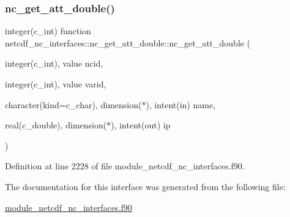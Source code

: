 \subsubsection{\texorpdfstring{nc\+\_\+get\+\_\+att\+\_\+double()}{nc\_get\_att\_double()}}
{\footnotesize\ttfamily integer(c\+\_\+int) function netcdf\+\_\+nc\+\_\+interfaces\+::nc\+\_\+get\+\_\+att\+\_\+double\+::nc\+\_\+get\+\_\+att\+\_\+double (\begin{DoxyParamCaption}\item[{integer(c\+\_\+int), value}]{ncid,  }\item[{integer(c\+\_\+int), value}]{varid,  }\item[{character(kind=c\+\_\+char), dimension($\ast$), intent(in)}]{name,  }\item[{real(c\+\_\+double), dimension($\ast$), intent(out)}]{ip }\end{DoxyParamCaption})}



Definition at line 2228 of file module\+\_\+netcdf\+\_\+nc\+\_\+interfaces.\+f90.



The documentation for this interface was generated from the following file\+:\begin{DoxyCompactItemize}
\item 
\hyperlink{module__netcdf__nc__interfaces_8f90}{module\+\_\+netcdf\+\_\+nc\+\_\+interfaces.\+f90}\end{DoxyCompactItemize}

